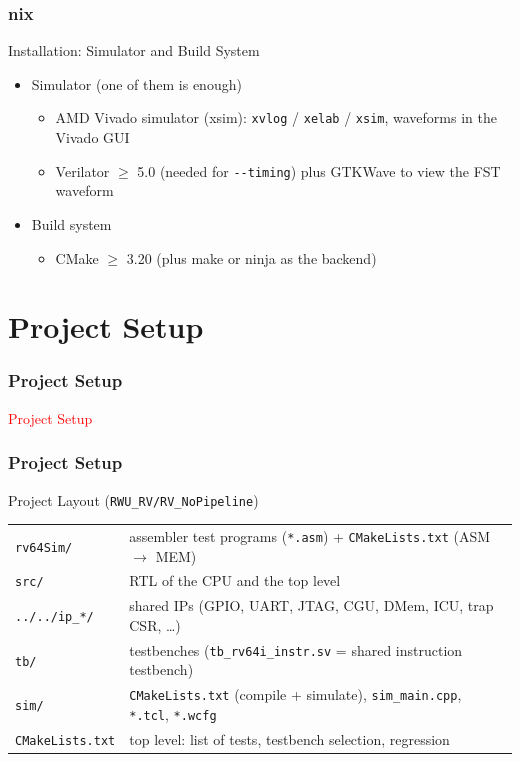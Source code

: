 \documentclass{beamer}
\newcommand{\astitle}{nix}
\newcommand{\assubtitle}{nix}
\newcommand{\cmd}[1]{\texttt{#1}}
\begin{document}
\renewcommand{\assubtitle}{Installation: Simulator and Build System}
\begin{frame}
\frametitle{\astitle}
\begin{block}{\assubtitle}
  \begin{itemize}
    \item Simulator (one of them is enough)
    \begin{itemize}
      \item AMD Vivado simulator (xsim): \cmd{xvlog} / \cmd{xelab} / \cmd{xsim},
        waveforms in the Vivado GUI
      \item Verilator $\geq$ 5.0 (needed for \cmd{-{}-timing})
        plus GTKWave to view the FST waveform
    \end{itemize}
    \item Build system
    \begin{itemize}
      \item CMake $\geq$ 3.20 (plus make or ninja as the backend)
    \end{itemize}
  \end{itemize}
\end{block}
\end{frame}

\section{Project Setup}
\renewcommand{\astitle}{Project Setup}
\begin{frame}
\frametitle{\astitle}
\textcolor{red}{Project Setup}
\end{frame}

\renewcommand{\assubtitle}{Project Layout (\texttt{RWU\_RV/RV\_NoPipeline})}
\begin{frame}
\frametitle{\astitle}
\begin{block}{\assubtitle}
  \small
  \begin{tabularx}{\linewidth}{@{}lY@{}}
    \cmd{rv64Sim/}        & assembler test programs (\cmd{*.asm}) + \cmd{CMakeLists.txt} (ASM $\rightarrow$ MEM)\\
    \cmd{src/}            & RTL of the CPU and the top level\\
    \cmd{../../ip\_*/}    & shared IPs (GPIO, UART, JTAG, CGU, DMem, ICU, trap CSR, \dots)\\
    \cmd{tb/}             & testbenches (\cmd{tb\_rv64i\_instr.sv} = shared instruction testbench)\\
    \cmd{sim/}            & \cmd{CMakeLists.txt} (compile + simulate), \cmd{sim\_main.cpp}, \cmd{*.tcl}, \cmd{*.wcfg}\\
    \cmd{CMakeLists.txt}  & top level: list of tests, testbench selection, regression\\
  \end{tabularx}
\end{block}
\end{frame}
\end{document}
